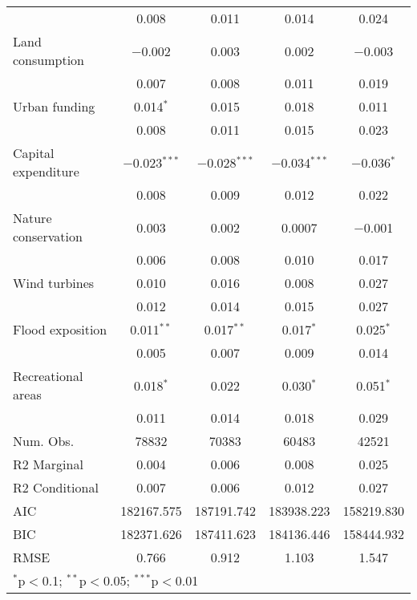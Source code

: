 \begin{table}
\begin{tabular}[t]{lcccc}
 & \num{0.008} & \num{0.011} & \num{0.014} & \num{0.024}\\
Land consumption & \num{-0.002} & \num{0.003} & \num{0.002} & \num{-0.003}\\
 & \num{0.007} & \num{0.008} & \num{0.011} & \num{0.019}\\
Urban funding & \num{0.014}$^{*}$ & \num{0.015} & \num{0.018} & \num{0.011}\\
 & \num{0.008} & \num{0.011} & \num{0.015} & \num{0.023}\\
Capital expenditure & \num{-0.023}$^{***}$ & \num{-0.028}$^{***}$ & \num{-0.034}$^{***}$ & \num{-0.036}$^{*}$\\
 & \num{0.008} & \num{0.009} & \num{0.012} & \num{0.022}\\
Nature conservation & \num{0.003} & \num{0.002} & \num{0.0007} & \num{-0.001}\\
 & \num{0.006} & \num{0.008} & \num{0.010} & \num{0.017}\\
Wind turbines & \num{0.010} & \num{0.016} & \num{0.008} & \num{0.027}\\
 & \num{0.012} & \num{0.014} & \num{0.015} & \num{0.027}\\
Flood exposition & \num{0.011}$^{**}$ & \num{0.017}$^{**}$ & \num{0.017}$^{*}$ & \num{0.025}$^{*}$\\
 & \num{0.005} & \num{0.007} & \num{0.009} & \num{0.014}\\
Recreational areas & \num{0.018}$^{*}$ & \num{0.022} & \num{0.030}$^{*}$ & \num{0.051}$^{*}$\\
 & \num{0.011} & \num{0.014} & \num{0.018} & \num{0.029}\\
\midrule
Num. Obs. & \num{78832} & \num{70383} & \num{60483} & \num{42521}\\
R2 Marginal & \num{0.004} & \num{0.006} & \num{0.008} & \num{0.025}\\
R2 Conditional & \num{0.007} & \num{0.006} & \num{0.012} & \num{0.027}\\
AIC & \num{182167.575} & \num{187191.742} & \num{183938.223} & \num{158219.830}\\
BIC & \num{182371.626} & \num{187411.623} & \num{184136.446} & \num{158444.932}\\
RMSE & \num{0.766} & \num{0.912} & \num{1.103} & \num{1.547}\\
\bottomrule
\multicolumn{5}{l}{\rule{0pt}{1em}$^{*}$p$<$0.1; $^{**}$p$<$0.05; $^{***}$p$<$0.01}\\
\end{tabular}
\end{table}